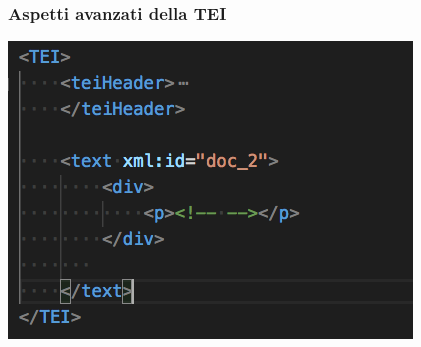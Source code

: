     \begin{frame}
        \frametitle{Aspetti avanzati della TEI}
        \addtocounter{nframe}{1}
        
            \begin{center}
                \includegraphics[width=.85\textwidth]{imgs/doc_2.png}
            \end{center}
        
    \end{frame}

